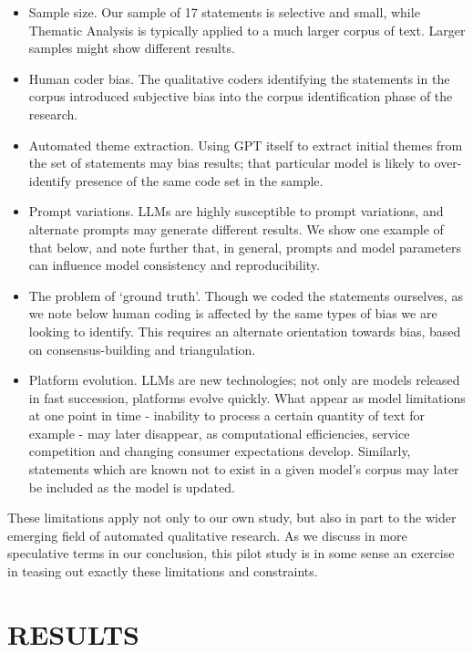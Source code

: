 \documentclass{article}
\begin{document}
\begin{itemize}
    \item Sample size. Our sample of 17 statements is selective and small, while Thematic Analysis is typically applied to a much larger corpus of text. Larger samples might show different results.
    \item Human coder bias. The qualitative coders identifying the statements in the corpus introduced subjective bias into the corpus identification phase of the research. 
    \item Automated theme extraction. Using GPT itself to extract initial themes from the set of statements may bias results; that particular model is likely to over-identify presence of the same code set in the sample. 
    \item Prompt variations. LLMs are highly susceptible to prompt variations, and alternate prompts may generate different results. We show one example of that below, and note further that, in general, prompts and model parameters can influence model consistency and reproducibility.
    \item The problem of `ground truth'. Though we coded the statements ourselves, as we note below human coding is affected by the same types of bias we are looking to identify. This requires an alternate orientation towards bias, based on consensus-building and triangulation.
    \item Platform evolution. LLMs are new technologies; not only are models released in fast succession, platforms evolve quickly. What appear as model limitations at one point in time - inability to process a certain quantity of text for example - may later disappear, as computational efficiencies, service competition and changing consumer expectations develop. Similarly, statements which are known not to exist in a given model's corpus may later be included as the model is updated.
\end{itemize}

These limitations apply not only to our own study, but also in part to the wider emerging field of automated qualitative research. As we discuss in more speculative terms in our conclusion, this pilot study is in some sense an exercise in teasing out exactly these limitations and constraints.


\section{RESULTS}\label{results}
\end{document}
